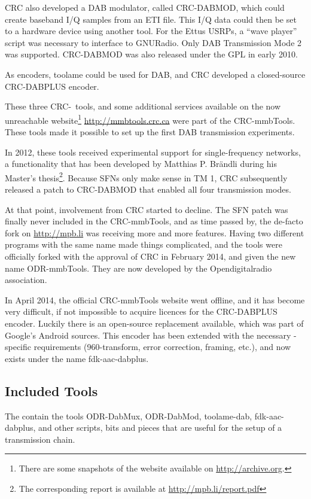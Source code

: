 CRC also developed a DAB modulator, called \mbox{CRC-DABMOD}, which could create
baseband I/Q samples from an ETI file. This I/Q data could then be set to
a hardware device using another tool. For the Ettus USRPs, a ``wave player''
script was necessary to interface to GNURadio. Only DAB Transmission Mode 2 was
supported. \mbox{CRC-DABMOD} was also released under the GPL in early 2010.

As encoders, toolame could be used for DAB, and CRC developed a closed-source
\mbox{CRC-DABPLUS} \dabplus encoder.

These three CRC-~tools, and some additional services available on the now
unreachable website\footnote{There are some snapshots of the website available
    on \url{http://archive.org}.} \url{http://mmbtools.crc.ca} were
part of the \mbox{CRC-mmbTools}. These tools made it possible to set up the
first DAB transmission experiments.

In 2012, these tools received experimental support for single-frequency
networks, a functionality that has been developed by Matthias P. Brändli during
his Master's thesis\footnote{The corresponding report is available at
    \url{http://mpb.li/report.pdf}}.
Because SFNs only make sense in TM 1, CRC subsequently released a patch to
\mbox{CRC-DABMOD} that enabled all four transmission modes.

At that point, involvement from CRC started to decline. The SFN patch was
finally never included in the \mbox{CRC-mmbTools}, and as time passed by, the
de-facto fork on \url{http://mpb.li} was receiving more and more features.
Having two different programs with the same name made things complicated, and
the tools were officially forked with the approval of CRC in February 2014, and
given the new name \mbox{ODR-mmbTools}. They are now developed by the
Opendigitalradio association.

In April 2014, the official \mbox{CRC-mmbTools} website went offline, and it has
become very difficult, if not impossible to acquire licences for the
\mbox{CRC-DABPLUS} encoder. Luckily there is an open-source replacement
available, which was part of Google's Android sources. This encoder has been
extended with the necessary \dabplus{}-specific requirements (960-transform,
error correction, framing, etc.), and now exists under the name
\mbox{fdk-aac-dabplus}.

\subsection{Included Tools}
The \mmbtools contain the tools \mbox{ODR-DabMux}, \mbox{ODR-DabMod},
\mbox{toolame-dab}, \mbox{fdk-aac-dabplus}, and other scripts, bits and pieces
that are useful for the setup of a transmission chain.

